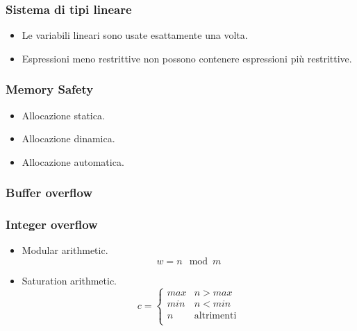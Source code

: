 \documentclass{beamer}
\begin{document}
\begin{frame}
    \frametitle{Sistema di tipi lineare}
    \begin{itemize}
        \item Le variabili lineari sono usate esattamente una volta.
        \item Espressioni meno restrittive non possono contenere espressioni più restrittive.
    \end{itemize}
\end{frame}

\begin{frame}
    \frametitle{Memory Safety}
    \begin{itemize}
        \item Allocazione statica.
        \item Allocazione dinamica.
        \item Allocazione automatica.
    \end{itemize}    
\end{frame}

\begin{frame}
    \frametitle{Buffer overflow}
    
        
\end{frame}

\begin{frame}
    \frametitle{Integer overflow}
    \begin{itemize}
        \item Modular arithmetic. \[ w = n \mod m \]
        \item Saturation arithmetic. 
        \[ 
            c = \begin{cases}
            max & n > max \\
            min & n < min \\
            n  & \text{altrimenti} \\
        \end{cases} 
        \]
    \end{itemize}
\end{frame}
\end{document}

